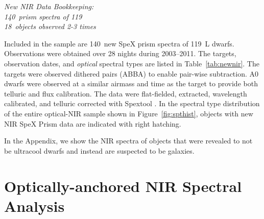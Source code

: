 \documentclass[12pt,preprint]{aastex}
\newcommand{\NewPrismSpectra}{140} %
\newcommand{\dupes}{18} %
\newcommand{\NewPrismObjects}{119} %
\begin{document}
\label{sec:obs_new_nir}

\emph{New NIR Data Bookkeeping: \\
\NewPrismSpectra~prism spectra of \NewPrismObjects \\
\dupes~objects observed 2-3 times}

Included in the sample are \NewPrismSpectra~new SpeX prism spectra of \NewPrismObjects~L dwarfs. 
Observations were obtained over 28 nights during 2003--2011. The targets, observation dates, and \emph{optical} spectral types are listed in Table~\ref{tab:newnir}. 
The targets were observed dithered pairs (ABBA) to enable pair-wise subtraction. A0 dwarfs were observed at a similar airmass and time as the target to provide both telluric and flux calibration.
The data were flat-fielded, extracted, wavelength calibrated, and telluric corrected with Spextool \citep{Cushing04,Spextool2}.
In the spectral type distribution of the entire optical-NIR sample shown in Figure~\ref{fig:spthist}, objects with new NIR SpeX Prism data are indicated with right hatching.

In the Appendix, we show the NIR spectra of objects that were revealed to not be ultracool dwarfs and instead are suspected to be galaxies.

\clearpage
\section{Optically-anchored NIR Spectral Analysis}
\end{document}
